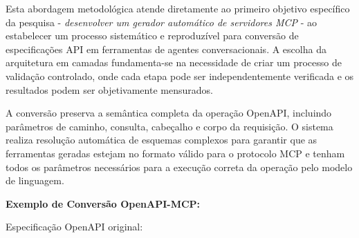 \documentclass[
]{article}
\newenvironment{Shaded}{}{}
\newcommand{\AttributeTok}[1]{\textcolor[rgb]{0.49,0.56,0.16}{#1}}
\newcommand{\CharTok}[1]{\textcolor[rgb]{0.25,0.44,0.63}{#1}}
\newcommand{\FunctionTok}[1]{\textcolor[rgb]{0.02,0.16,0.49}{#1}}
\newcommand{\KeywordTok}[1]{\textcolor[rgb]{0.00,0.44,0.13}{\textbf{#1}}}
\newcommand{\StringTok}[1]{\textcolor[rgb]{0.25,0.44,0.63}{#1}}
\begin{document}
Esta abordagem metodológica atende diretamente ao primeiro objetivo
específico da pesquisa - \emph{desenvolver um gerador automático de
servidores MCP} - ao estabelecer um processo sistemático e reproduzível
para conversão de especificações API em ferramentas de agentes
conversacionais. A escolha da arquitetura em camadas fundamenta-se na
necessidade de criar um processo de validação controlado, onde cada
etapa pode ser independentemente verificada e os resultados podem ser
objetivamente mensurados.

A conversão preserva a semântica completa da operação OpenAPI, incluindo
parâmetros de caminho, consulta, cabeçalho e corpo da requisição. O
sistema realiza resolução automática de esquemas complexos para garantir
que as ferramentas geradas estejam no formato válido para o protocolo
MCP e tenham todos os parâmetros necessários para a execução correta da
operação pelo modelo de linguagem.

\textbf{Exemplo de Conversão OpenAPI-MCP:}

Especificação OpenAPI original:

\begin{Shaded}
\end{Shaded}
\end{document}
